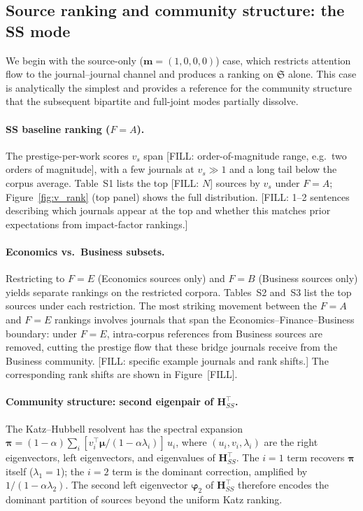 \subsection{Source ranking and community structure: the SS mode}
\label{sec:results_ss}

We begin with the source-only ($\mathbf{m}=(1,0,0,0)$) case, which
restricts attention flow to the journal--journal channel and produces a
ranking on $\mathfrak{S}$ alone. This case is analytically the simplest and
provides a reference for the community structure that the subsequent
bipartite and full-joint modes partially dissolve.

\paragraph{SS baseline ranking ($F=A$).}
The prestige-per-work scores $v_s$ span [FILL: order-of-magnitude range, e.g.\ two orders of magnitude], with a
few journals at $v_s \gg 1$ and a long tail below the corpus
average. Table~S1 lists the top [FILL: $N$] sources by $v_s$ under
$F=A$; Figure~\ref{fig:v_rank} (top panel) shows the full distribution.
[FILL: 1--2 sentences describing which journals appear at the top and
whether this matches prior expectations from impact-factor rankings.]

\paragraph{Economics vs.\ Business subsets.}
Restricting to $F=E$ (Economics sources only) and $F=B$ (Business
sources only) yields separate rankings on the restricted corpora.
Tables~S2 and~S3 list the top sources under each restriction.
The most striking movement between the $F=A$ and $F=E$ rankings involves
journals that span the Economics--Finance--Business boundary: under $F=E$,
intra-corpus references from Business sources are removed, cutting the
prestige flow that these bridge journals receive from the Business
community. [FILL: specific example journals and rank shifts.]
The corresponding rank shifts are shown in Figure~[FILL].

\paragraph{Community structure: second eigenpair of $\mathbf{H}_{SS}^\top$.}
The Katz--Hubbell resolvent has the spectral expansion
$\boldsymbol{\pi} = (1-\alpha)\sum_i [v_i^\top\boldsymbol{\mu}/(1-\alpha\lambda_i)]\,u_i$,
where $(u_i,v_i,\lambda_i)$ are the right eigenvectors, left eigenvectors,
and eigenvalues of $\mathbf{H}_{SS}^\top$.
The $i=1$ term recovers $\boldsymbol{\pi}$ itself ($\lambda_1=1$);
the $i=2$ term is the dominant correction, amplified by $1/(1-\alpha\lambda_2)$.
The second left eigenvector $\boldsymbol{\varphi}_2$ of $\mathbf{H}_{SS}^\top$
therefore encodes the dominant partition of sources beyond the uniform
Katz ranking.

